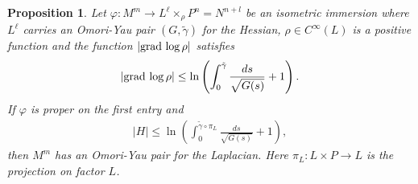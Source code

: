 \documentclass[a4paper]{amsart}
\newtheorem{proposition}{Proposition}
\begin{document}
\begin{proposition}\label{pullbackomoriyau} Let $ \varphi : M^{m} \rightarrow L^{\ell}\times_{\rho}P^n = N^{n+l} $ be an isometric immersion where $ L^\ell $ carries an Omori-Yau pair $(G,\tilde{\gamma}) $ for the Hessian, $ \rho \in C^{\infty}(L) $ is a positive function and the function $ \vert {{{\rm{grad}\,}}} \log \rho\vert $ satisfies
\begin{eqnarray}\label{hipeta}
\vert {{{\rm{grad}\,}}} \log \rho\vert \leq \ln\left(\int_{0}^{\tilde{\gamma}}\frac{ds}{\sqrt{G(s)}} + 1\right).
\end{eqnarray}
If $ \varphi $ is proper on the first entry and
\begin{eqnarray}\label{hipcurvmedia}
\vert H\vert \leq \ln\left(\int_{0}^{\tilde{\gamma}\circ\pi_{L}}\frac{ds}{\sqrt{G(s)}}+1\right),
\end{eqnarray}then $ M^m $ has an Omori-Yau pair for the Laplacian.
Here $ \pi_{L}\colon L\times P\to L $ is the projection on factor $L$.
\end{proposition}
\end{document}

